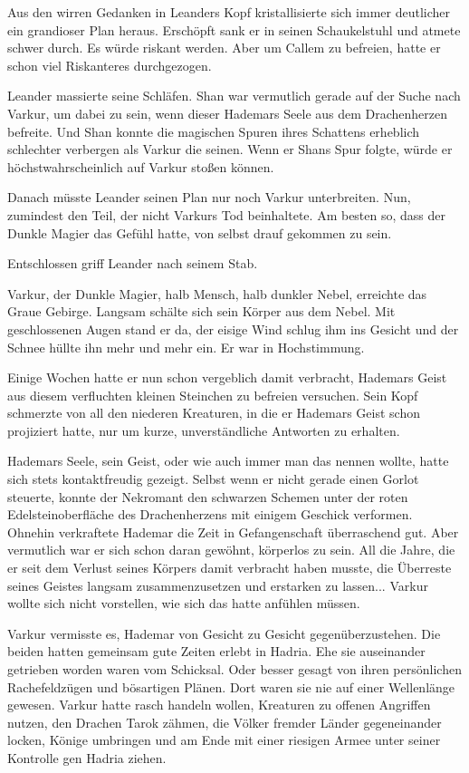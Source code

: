 Aus den wirren Gedanken in Leanders Kopf kristallisierte sich immer deutlicher ein grandioser Plan heraus. Erschöpft sank er in seinen Schaukelstuhl und atmete schwer durch. Es würde riskant werden. Aber um Callem zu befreien, hatte er schon viel Riskanteres durchgezogen.

Leander massierte seine Schläfen. Shan war vermutlich gerade auf der Suche nach Varkur, um dabei zu sein, wenn dieser Hademars Seele aus dem Drachenherzen befreite. Und Shan konnte die magischen Spuren ihres Schattens erheblich schlechter verbergen als Varkur die seinen. Wenn er Shans Spur folgte, würde er höchstwahrscheinlich auf Varkur stoßen können.

Danach müsste Leander seinen Plan nur noch Varkur unterbreiten. Nun, zumindest den Teil, der nicht Varkurs Tod beinhaltete. Am besten so, dass der Dunkle Magier das Gefühl hatte, von selbst drauf gekommen zu sein.

Entschlossen griff Leander nach seinem Stab.\bigskip







Varkur, der Dunkle Magier, halb Mensch, halb dunkler Nebel, erreichte das Graue Gebirge. Langsam schälte sich sein Körper aus dem Nebel. Mit geschlossenen Augen stand er da, der eisige Wind schlug ihm ins Gesicht und der Schnee hüllte ihn mehr und mehr ein. Er war in Hochstimmung.

Einige Wochen hatte er nun schon vergeblich damit verbracht, Hademars Geist aus diesem verfluchten kleinen Steinchen zu befreien versuchen. Sein Kopf schmerzte von all den niederen Kreaturen, in die er Hademars Geist schon projiziert hatte, nur um kurze, unverständliche Antworten zu erhalten.

Hademars Seele, sein Geist, oder wie auch immer man das nennen wollte, hatte sich stets kontaktfreudig gezeigt. Selbst wenn er nicht gerade einen Gorlot steuerte, konnte der Nekromant den schwarzen Schemen unter der roten Edelsteinoberfläche des Drachenherzens mit einigem Geschick verformen. Ohnehin verkraftete Hademar die Zeit in Gefangenschaft überraschend gut. Aber vermutlich war er sich schon daran gewöhnt, körperlos zu sein. All die Jahre, die er seit dem Verlust seines Körpers damit verbracht haben musste, die Überreste seines Geistes langsam zusammenzusetzen und erstarken zu lassen... Varkur wollte sich nicht vorstellen, wie sich das hatte anfühlen müssen.

Varkur vermisste es, Hademar von Gesicht zu Gesicht gegenüberzustehen. Die beiden hatten gemeinsam gute Zeiten erlebt in Hadria. Ehe sie auseinander getrieben worden waren vom Schicksal. Oder besser gesagt von ihren persönlichen Rachefeldzügen und bösartigen Plänen. Dort waren sie nie auf einer Wellenlänge gewesen. Varkur hatte rasch handeln wollen, Kreaturen zu offenen Angriffen nutzen, den Drachen Tarok zähmen, die Völker fremder Länder gegeneinander locken, Könige umbringen und am Ende mit einer riesigen Armee unter seiner Kontrolle gen Hadria ziehen.

